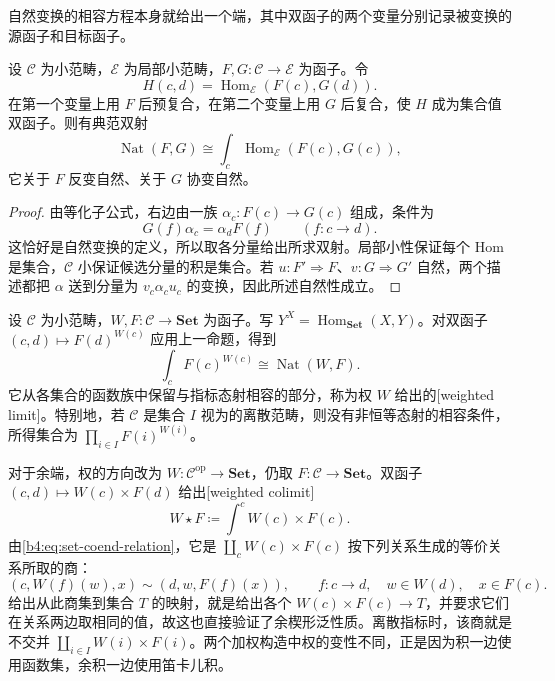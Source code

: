 自然变换的相容方程本身就给出一个端，其中双函子的两个变量分别记录被变换的源函子和目标函子。

\begin{proposition}[自然变换集合的端表达]\label{b4:prop:natural-transformations-end}
	设 \(\mathcal C\) 为小范畴，\(\mathcal E\) 为局部小范畴，\(F,G:\mathcal C\rightarrow\mathcal E\) 为函子。令
	\[
		H(c,d)=\operatorname{Hom}_{\mathcal E}(F(c),G(d)).
	\]
	在第一个变量上用 \(F\) 后预复合，在第二个变量上用 \(G\) 后复合，使 \(H\) 成为集合值双函子。则有典范双射
	\[
		\operatorname{Nat}(F,G)
		\cong\int_c\operatorname{Hom}_{\mathcal E}(F(c),G(c)),
	\]
	它关于 \(F\) 反变自然、关于 \(G\) 协变自然。
\end{proposition}
\begin{proof}
	由等化子公式，右边由一族 \(\alpha_c:F(c)\rightarrow G(c)\) 组成，条件为
	\[
		G(f)\alpha_c=\alpha_dF(f)\qquad(f:c\rightarrow d).
	\]
	这恰好是自然变换的定义，所以取各分量给出所求双射。局部小性保证每个 Hom 是集合，\(\mathcal C\) 小保证候选分量的积是集合。若 \(u:F'\Rightarrow F\)、\(v:G\Rightarrow G'\) 自然，两个描述都把 \(\alpha\) 送到分量为 \(v_c\alpha_cu_c\) 的变换，因此所述自然性成立。
\end{proof}

\begin{example}[集合值加权构造]\label{b4:exm:set-weighted-constructions}
	设 \(\mathcal C\) 为小范畴，\(W,F:\mathcal C\rightarrow\mathbf{Set}\) 为函子。写 \(Y^X=\operatorname{Hom}_{\mathbf{Set}}(X,Y)\)。对双函子 \((c,d)\mapsto F(d)^{W(c)}\) 应用上一命题，得到
	\[
		\int_cF(c)^{W(c)}\cong\operatorname{Nat}(W,F).
	\]
	它从各集合的函数族中保留与指标态射相容的部分，称为权 \(W\) 给出的[weighted limit]。特别地，若 \(\mathcal C\) 是集合 \(I\) 视为的离散范畴，则没有非恒等态射的相容条件，所得集合为 \(\prod_{i\in I}F(i)^{W(i)}\)。

	\ProseParagraphBreak
	对于余端，权的方向改为 \(W:\mathcal C^{\mathrm{op}}\rightarrow\mathbf{Set}\)，仍取 \(F:\mathcal C\rightarrow\mathbf{Set}\)。双函子 \((c,d)\mapsto W(c)\times F(d)\) 给出[weighted colimit]
	\[
		W\star F\coloneqq\int^cW(c)\times F(c).
	\]
	由\eqref{b4:eq:set-coend-relation}，它是 \(\coprod_cW(c)\times F(c)\) 按下列关系生成的等价关系所取的商：
	\begin{equation}\label{b4:eq:weighted-coend-relation}
		(c,W(f)(w),x)\sim(d,w,F(f)(x)),
		\qquad f:c\rightarrow d,\quad w\in W(d),\quad x\in F(c).
	\end{equation}
	给出从此商集到集合 \(T\) 的映射，就是给出各个 \(W(c)\times F(c)\rightarrow T\)，并要求它们在关系两边取相同的值，故这也直接验证了余楔形泛性质。离散指标时，该商就是不交并 \(\coprod_{i\in I}W(i)\times F(i)\)。两个加权构造中权的变性不同，正是因为积一边使用函数集，余积一边使用笛卡儿积。
\end{example}

